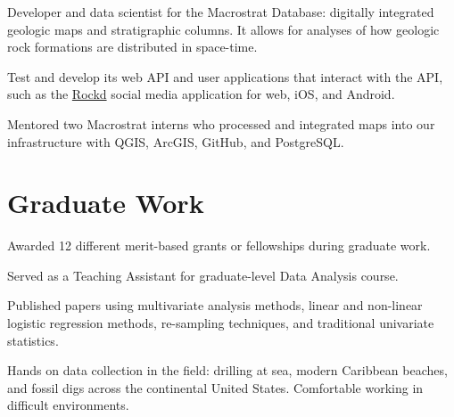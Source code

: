 \documentclass[]{deedy-resume-openfont}
\begin{document}
\begin{minipage}[t]{0.66\textwidth}
\begin{tightemize}
\item Developer and data scientist for the Macrostrat Database: digitally integrated geologic maps and stratigraphic columns. It allows for analyses of how geologic rock formations are distributed in space-time.
\item Test and develop its web API and user applications that interact with the API, such as the \href{https://rockd.org}{Rockd} social media application for web, iOS, and Android.
\item Mentored two Macrostrat interns who processed and integrated maps into our infrastructure with QGIS, ArcGIS, GitHub, and PostgreSQL.
\end{tightemize}
\sectionsep

\section{Graduate Work}

\begin{tightemize}
\item Awarded 12 different merit-based grants or fellowships during graduate work.
\item Served as a Teaching Assistant for graduate-level Data Analysis course.
\item Published papers using multivariate analysis methods, linear and non-linear logistic regression methods, re-sampling techniques, and traditional univariate statistics.
\item Hands on data collection in the field: drilling at sea, modern Caribbean beaches, and fossil digs across the continental United States. Comfortable working in difficult environments.
\end{tightemize}
\sectionsep




\end{minipage}
\end{document}
